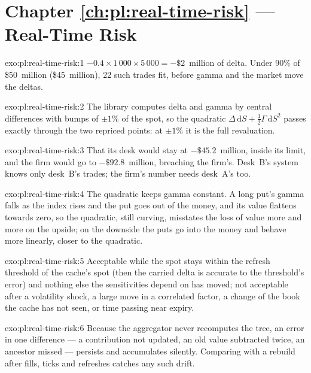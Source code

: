 \section*{Chapter \ref{ch:pl:real-time-risk} --- Real-Time Risk}

\begin{solution}{exo:pl:real-time-risk:1}
$-0.4 \times 1\,000 \times 5\,000 = -\$2$~million of delta. Under 90\% of \$50~million (\$45~million), 22 such trades fit, before gamma and the
market move the deltas.
\end{solution}

\begin{solution}{exo:pl:real-time-risk:2}
The library computes delta and gamma by central differences with bumps of $\pm1\%$ of the spot, so the quadratic $\Delta\,\mathrm{d}S +
\frac12\Gamma\,\mathrm{d}S^2$ passes exactly through the two repriced points: at $\pm1\%$ it is the full revaluation.
\end{solution}

\begin{solution}{exo:pl:real-time-risk:3}
That its desk would stay at $-\$45.2$~million, inside its limit, and the firm would go to $-\$92.8$~million, breaching the firm's. Desk~B's
system knows only desk~B's trades; the firm's number needs desk~A's too.
\end{solution}

\begin{solution}{exo:pl:real-time-risk:4}
The quadratic keeps gamma constant. A long put's gamma falls as the index rises and the put goes out of the money, and its value flattens
towards zero, so the quadratic, still curving, misstates the loss of value more and more on the upside; on the downside the puts go into the
money and behave more linearly, closer to the quadratic.
\end{solution}

\begin{solution}{exo:pl:real-time-risk:5}
Acceptable while the spot stays within the refresh threshold of the cache's spot (then the carried delta is accurate to the threshold's
error) and nothing else the sensitivities depend on has moved; not acceptable after a volatility shock, a large move in a correlated factor, a
change of the book the cache has not seen, or time passing near expiry.
\end{solution}

\begin{solution}{exo:pl:real-time-risk:6}
Because the aggregator never recomputes the tree, an error in one difference --- a contribution not updated, an old value subtracted twice,
an ancestor missed --- persists and accumulates silently. Comparing with a rebuild after fills, ticks and refreshes catches any such drift.
\end{solution}

